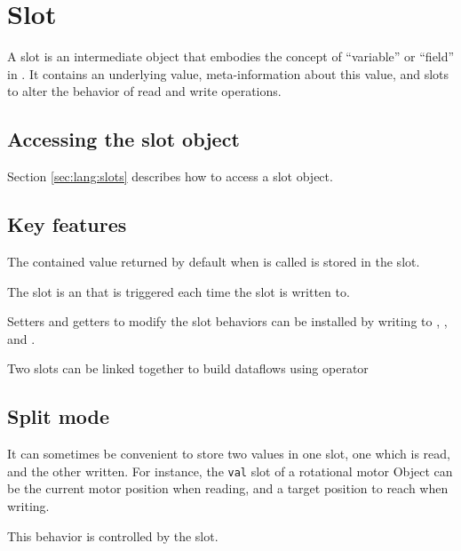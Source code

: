 
\section{Slot}

A slot is an intermediate object that embodies the concept of ``variable''
or ``field'' in \us.  It contains an underlying value, meta-information
about this value, and slots to alter the behavior of read and write
operations.

\subsection{Accessing the slot object}
Section \autoref{sec:lang:slots} describes how to access a slot object.

\subsection{Key features}

The contained value returned by default when 
is called is stored in the  slot.

The  slot is an  that is triggered each
time the slot is written to.

Setters and getters to modify the slot behaviors can be installed by writing
to , ,  and .

Two slots can be linked together to build dataflows using operator

\subsection{Split mode}
\label{sec:lang:slot:split}

It can sometimes be convenient to store two values in one slot, one which is
read, and the other written. For instance, the \lstinline|val| slot of
a rotational motor Object can be the current motor position when reading, and
a target position to reach when writing.

This behavior is controlled by the  slot.

